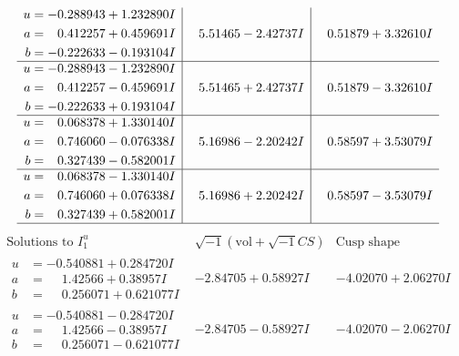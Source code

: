 \documentclass[1p]{elsarticle_modified}
\theoremstyle{definition}
\newcommand{\I}{\sqrt{-1}}
\begin{document}
$$\begin{array}{c|c|c}
\begin{aligned}
u &= -0.288943 + 1.232890 I \\
a &= \phantom{-}0.412257 + 0.459691 I \\
b &= -0.222633 - 0.193104 I\end{aligned}
 & \phantom{-}5.51465 - 2.42737 I & \phantom{-}0.51879 + 3.32610 I \\ \hline\begin{aligned}
u &= -0.288943 - 1.232890 I \\
a &= \phantom{-}0.412257 - 0.459691 I \\
b &= -0.222633 + 0.193104 I\end{aligned}
 & \phantom{-}5.51465 + 2.42737 I & \phantom{-}0.51879 - 3.32610 I \\ \hline\begin{aligned}
u &= \phantom{-}0.068378 + 1.330140 I \\
a &= \phantom{-}0.746060 - 0.076338 I \\
b &= \phantom{-}0.327439 - 0.582001 I\end{aligned}
 & \phantom{-}5.16986 - 2.20242 I & \phantom{-}0.58597 + 3.53079 I \\ \hline\begin{aligned}
u &= \phantom{-}0.068378 - 1.330140 I \\
a &= \phantom{-}0.746060 + 0.076338 I \\
b &= \phantom{-}0.327439 + 0.582001 I\end{aligned}
 & \phantom{-}5.16986 + 2.20242 I & \phantom{-}0.58597 - 3.53079 I\\
 \hline 
 \end{array}$$\newpage$$\begin{array}{c|c|c}  
\text{Solutions to }I^u_{1}& \I (\text{vol} + \sqrt{-1}CS) & \text{Cusp shape}\\
 \hline 
\begin{aligned}
u &= -0.540881 + 0.284720 I \\
a &= \phantom{-}1.42566 + 0.38957 I \\
b &= \phantom{-}0.256071 + 0.621077 I\end{aligned}
 & -2.84705 + 0.58927 I & -4.02070 + 2.06270 I \\ \hline\begin{aligned}
u &= -0.540881 - 0.284720 I \\
a &= \phantom{-}1.42566 - 0.38957 I \\
b &= \phantom{-}0.256071 - 0.621077 I\end{aligned}
 & -2.84705 - 0.58927 I & -4.02070 - 2.06270 I \\ \hline\begin{aligned}

\end{aligned}
\end{array}$$
\end{document}

